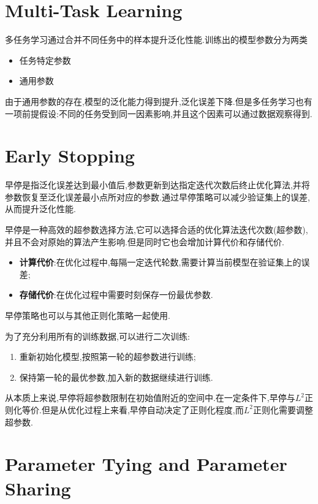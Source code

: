 \section{Multi-Task Learning}

多任务学习通过合并不同任务中的样本提升泛化性能.训练出的模型参数分为两类
\begin{itemize}
    \item 任务特定参数
    \item 通用参数
\end{itemize}

由于通用参数的存在,模型的泛化能力得到提升,泛化误差下降.但是多任务学习也有一项前提假设:不同的任务受到同一因素影响,并且这个因素可以通过数据观察得到.

\section{Early Stopping}

早停是指泛化误差达到最小值后,参数更新到达指定迭代次数后终止优化算法,并将参数恢复至泛化误差最小点所对应的参数.通过早停策略可以减少验证集上的误差,从而提升泛化性能.

早停是一种高效的超参数选择方法,它可以选择合适的优化算法迭代次数(超参数),并且不会对原始的算法产生影响.但是同时它也会增加计算代价和存储代价.
\begin{itemize}
    \item \textbf{计算代价}:在优化过程中,每隔一定迭代轮数,需要计算当前模型在验证集上的误差;
    \item \textbf{存储代价}:在优化过程中需要时刻保存一份最优参数.
\end{itemize}

早停策略也可以与其他正则化策略一起使用.

为了充分利用所有的训练数据,可以进行二次训练:
\begin{enumerate}
    \item 重新初始化模型,按照第一轮的超参数进行训练;
    \item 保持第一轮的最优参数,加入新的数据继续进行训练.
\end{enumerate}

从本质上来说,早停将超参数限制在初始值附近的空间中.在一定条件下,早停与$L^2$正则化等价.但是从优化过程上来看,早停自动决定了正则化程度,而$L^2$正则化需要调整超参数.

\section{Parameter Tying and Parameter Sharing}

